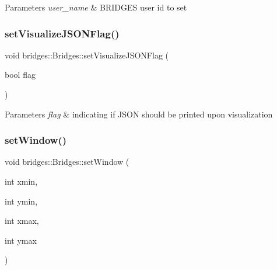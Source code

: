 \begin{DoxyParams}{Parameters}
{\em user\+\_\+name} & B\+R\+I\+D\+G\+ES user id to set \\
\hline
\end{DoxyParams}
\mbox{\label{classbridges_1_1_bridges_a69aca37ab2729d0345e0549d7baf0423}} 
\subsubsection{\texorpdfstring{set\+Visualize\+J\+S\+O\+N\+Flag()}{setVisualizeJSONFlag()}}
{\footnotesize\ttfamily void bridges\+::\+Bridges\+::set\+Visualize\+J\+S\+O\+N\+Flag (\begin{DoxyParamCaption}\item[{bool}]{flag }\end{DoxyParamCaption})\hspace{0.3cm}{\ttfamily [inline]}}


\begin{DoxyParams}{Parameters}
{\em flag} & indicating if J\+S\+ON should be printed upon visualization \\
\hline
\end{DoxyParams}
\mbox{\label{classbridges_1_1_bridges_a4e4817085ea8147039a2be72792b6a6e}} 
\subsubsection{\texorpdfstring{set\+Window()}{setWindow()}\hspace{0.1cm}{\footnotesize\ttfamily [1/2]}}
{\footnotesize\ttfamily void bridges\+::\+Bridges\+::set\+Window (\begin{DoxyParamCaption}\item[{int}]{xmin,  }\item[{int}]{ymin,  }\item[{int}]{xmax,  }\item[{int}]{ymax }\end{DoxyParamCaption})\hspace{0.3cm}{\ttfamily [inline]}}

